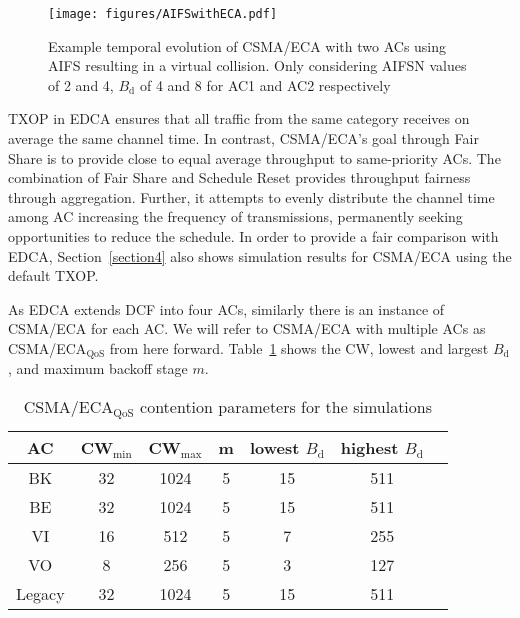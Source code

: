 \documentclass[a4paper]{article}
\begin{document}
	\begin{figure}[tb]
	\centering
		\texttt{[image: figures/AIFSwithECA.pdf]}
		\caption{Example temporal evolution of CSMA/ECA with two ACs using AIFS resulting in a virtual collision. Only considering AIFSN values of 2 and 4, $B_{\text{d}}$ of 4 and 8 for AC1 and AC2 respectively}
		\label{fig:AIFSinECA}
	\end{figure}


TXOP in EDCA ensures that all traffic from the same category receives on average the same channel time. In contrast, CSMA/ECA's goal through Fair Share is to provide close to equal average throughput to same-priority ACs. The combination of Fair Share and Schedule Reset provides throughput fairness through aggregation. Further, it attempts to evenly distribute the channel time among AC increasing the frequency of transmissions, permanently seeking opportunities to reduce the schedule. In order to provide a fair comparison with EDCA, Section~\ref{section4} also shows simulation results for CSMA/ECA using the default TXOP.

As EDCA extends DCF into four ACs, similarly there is an instance of CSMA/ECA for each AC. We will refer to CSMA/ECA with multiple ACs as CSMA/ECA$_{\text{QoS}}$ from here forward. Table~\ref{tab:newQoSparams} shows the CW, lowest and largest $B_{\text{d}}$, and maximum backoff stage $m$.

	\begin{table}[t]
		\centering
		\caption{CSMA/ECA$_{\text{QoS}}$ contention parameters for the simulations}
		\label{tab:newQoSparams}
		\begin{tabular}{|c|c|c|c|c|c|c|}
			\hline
			{\bfseries AC} & {\bfseries CW$_{\min}$} & {\bfseries CW$_{\max}$} & {\bfseries m} & {\bfseries lowest $B_{\text{d}}$} & {\bfseries highest $B_{\text{d}}$}\\
			\hline
			BK		       &	32				&		1024		  & 		5	&			15		        &		511		\\
			BE		       &	32				&		1024		  &		5	&			15		        &		511		\\
			VI		       &	16				&		512		  & 		5	&			7		     	&		255		\\
			VO		       &	8				&		256		  & 		5	&			3		        &		127		\\
			Legacy	       &	32				&		1024		  & 		5	&			15		        &		511		\\
			\hline
		\end{tabular}
	\end{table}
\end{document}
